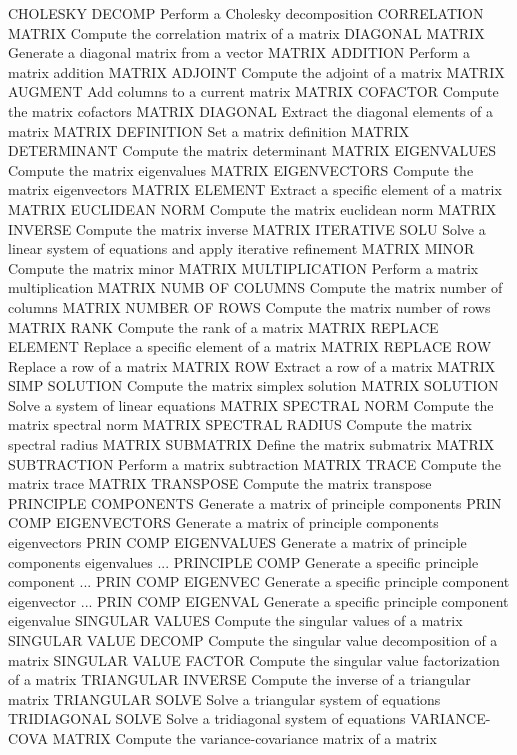  
      CHOLESKY DECOMP        Perform a Cholesky decomposition
      CORRELATION MATRIX     Compute the correlation matrix of a matrix
      DIAGONAL MATRIX        Generate a diagonal matrix from a vector
      MATRIX ADDITION        Perform a matrix addition
      MATRIX ADJOINT         Compute the adjoint of a matrix
      MATRIX AUGMENT         Add columns to a current matrix
      MATRIX COFACTOR        Compute the matrix cofactors
      MATRIX DIAGONAL        Extract the diagonal elements of a matrix
      MATRIX DEFINITION      Set a matrix definition
      MATRIX DETERMINANT     Compute the matrix determinant
      MATRIX EIGENVALUES     Compute the matrix eigenvalues
      MATRIX EIGENVECTORS    Compute the matrix eigenvectors
      MATRIX ELEMENT         Extract a specific element of a matrix
      MATRIX EUCLIDEAN NORM  Compute the matrix euclidean norm
      MATRIX INVERSE         Compute the matrix inverse
      MATRIX ITERATIVE SOLU  Solve a linear system of equations and
                             apply iterative refinement
      MATRIX MINOR           Compute the matrix minor
      MATRIX MULTIPLICATION  Perform a matrix multiplication
      MATRIX NUMB OF COLUMNS Compute the matrix number of columns
      MATRIX NUMBER OF ROWS  Compute the matrix number of rows
      MATRIX RANK            Compute the rank of a matrix
      MATRIX REPLACE ELEMENT Replace a specific element of a matrix
      MATRIX REPLACE ROW     Replace a row of a matrix
      MATRIX ROW             Extract a row of a matrix
      MATRIX SIMP SOLUTION   Compute the matrix simplex solution
      MATRIX SOLUTION        Solve a system of linear equations
      MATRIX SPECTRAL NORM   Compute the matrix spectral norm
      MATRIX SPECTRAL RADIUS Compute the matrix spectral radius
      MATRIX SUBMATRIX       Define the matrix submatrix
      MATRIX SUBTRACTION     Perform a matrix subtraction
      MATRIX TRACE           Compute the matrix trace
      MATRIX TRANSPOSE       Compute the matrix transpose
      PRINCIPLE COMPONENTS   Generate a matrix of principle components
      PRIN COMP EIGENVECTORS Generate a matrix of principle components
                             eigenvectors
      PRIN COMP EIGENVALUES  Generate a matrix of principle components
                             eigenvalues
      ... PRINCIPLE COMP     Generate a specific principle component
      ... PRIN COMP EIGENVEC Generate a specific principle component
                             eigenvector
      ... PRIN COMP EIGENVAL Generate a specific principle component
                             eigenvalue
      SINGULAR VALUES        Compute the singular values of a matrix
      SINGULAR VALUE DECOMP  Compute the singular value decomposition
                             of a matrix
      SINGULAR VALUE FACTOR  Compute the singular value factorization
                             of a matrix
      TRIANGULAR INVERSE     Compute the inverse of a triangular matrix
      TRIANGULAR SOLVE       Solve a triangular system of equations
      TRIDIAGONAL SOLVE      Solve a tridiagonal system of equations
      VARIANCE-COVA MATRIX   Compute the variance-covariance matrix of
                             a matrix
 
